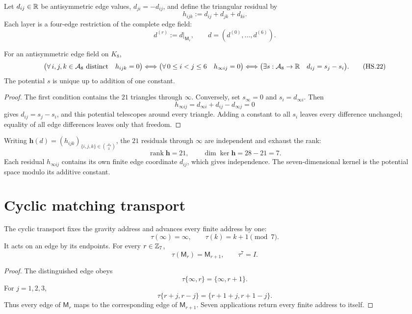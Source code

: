 \documentclass[10pt]{article}
\begin{document}
Let $d_{ij}\in\mathbb R$ be antisymmetric edge values,
$d_{ji}=-d_{ij}$, and define the triangular residual by
\[
h_{ijk}:=d_{ij}+d_{jk}+d_{ki}.
\tag{HS.20}
\]
Each layer is a four-edge restriction of the complete edge field:
\[
d^{(r)}:=d\vert_{\mathsf M_r},
\qquad
d=(d^{(0)},\ldots,d^{(6)}).
\tag{HS.21}
\]

\begin{theorem}
For an antisymmetric edge field on $K_8$,
\[
\bigl(\forall\,i,j,k\in\mathcal A_8\text{ distinct}\quad h_{ijk}=0\bigr)
\Longleftrightarrow
\bigl(\forall\,0\le i<j\le6\quad h_{\infty i j}=0\bigr)
\Longleftrightarrow
\bigl(\exists s:\mathcal A_8\to\mathbb R\quad d_{ij}=s_j-s_i\bigr).
\tag{HS.22}
\]
The potential $s$ is unique up to addition of one constant.
\end{theorem}

\begin{proof}
The first condition contains the $21$ triangles through $\infty$. Conversely,
set $s_\infty=0$ and $s_i=d_{\infty i}$. Then
\[
h_{\infty i j}=d_{\infty i}+d_{ij}-d_{\infty j}=0
\]
gives $d_{ij}=s_j-s_i$, and this potential telescopes around every triangle.
Adding a constant to all $s_i$ leaves every difference unchanged; equality of
all edge differences leaves only that freedom.
\end{proof}

Writing $\mathbf h(d)=(h_{ijk})_{\{i,j,k\}\in\binom{\mathcal A_8}{3}}$,
the $21$ residuals through $\infty$ are independent and exhaust the rank:
\[
\operatorname{rank}\mathbf h=21,
\qquad
\dim\ker\mathbf h=28-21=7.
\tag{HS.23}
\]
Each residual $h_{\infty i j}$ contains its own finite edge coordinate
$d_{ij}$, which gives independence. The seven-dimensional kernel is the
potential space modulo its additive constant.

\section{Cyclic matching transport}

The cyclic transport fixes the gravity address and advances every finite
address by one:
\[
\tau(\infty)=\infty,
\qquad
\tau(k)=k+1\pmod 7.
\tag{HS.24}
\]
It acts on an edge by its endpoints. For every $r\in\mathbb Z_7$,
\[
\tau(\mathsf M_r)=\mathsf M_{r+1},
\qquad
\tau^7=I.
\tag{HS.25}
\]

\begin{proof}
The distinguished edge obeys
\[
\tau\{\infty,r\}=\{\infty,r+1\}.
\]
For $j=1,2,3$,
\[
\tau\{r+j,r-j\}=\{r+1+j,r+1-j\}.
\]
Thus every edge of $\mathsf M_r$ maps to the corresponding edge of
$\mathsf M_{r+1}$. Seven applications return every finite address to itself.
\end{proof}
\end{document}
